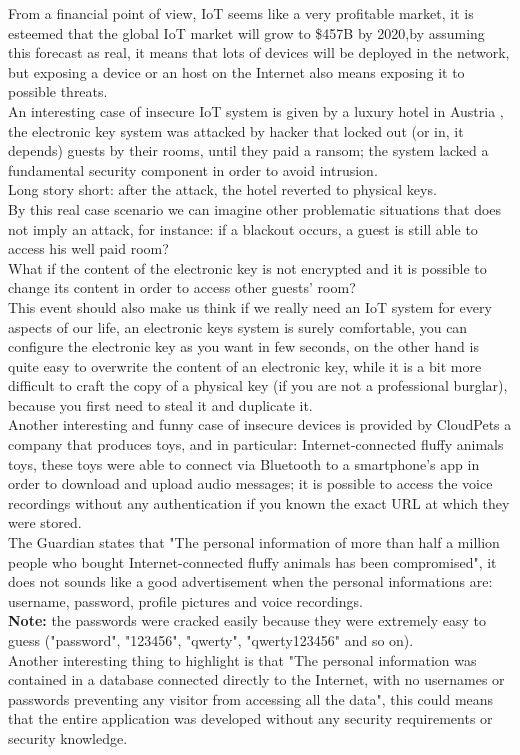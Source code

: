 	From a financial point of view, IoT seems like a very profitable market, it is esteemed that the global IoT market will grow to \$457B by 2020\cite{forbes},by assuming this forecast as real, it means that lots of devices will be deployed in the network, but exposing a device
	or an host on the Internet also means exposing it to possible threats.\\
	An interesting case of insecure IoT system is given by a luxury hotel in Austria \cite{whydoiot}, the electronic key system was attacked
	by hacker that locked out (or in, it depends) guests by their rooms, until they paid a ransom; the system lacked a fundamental security
	component in order to avoid intrusion.\\
	Long story short: after the attack, the hotel reverted to physical keys.\\
	By this real case scenario we can imagine other problematic situations that does not imply an attack, for instance: if a blackout occurs, a guest is still able to access	his well paid room?\\
	What if the content of the electronic key is not encrypted and it is possible to change its content in order to access other guests' room?\\
	This event should also make us think if we really need an IoT system for every aspects of our life, an electronic keys system is
	surely comfortable, you can configure the electronic key as you want in few seconds, on the other hand is quite easy to overwrite the content
	of an electronic key, while it is a bit more difficult to craft the copy of a physical key (if you are not a professional burglar), because you first need to steal it and duplicate it.\\
	Another interesting and funny case of insecure devices is provided by CloudPets\cite{toys} a company that produces toys, and in particular: Internet-connected fluffy animals toys,
	these toys were able to connect via Bluetooth to a smartphone's app in order to download and upload audio messages; it is possible to access the voice recordings without any authentication if you known the exact URL at which they were stored.\\
	The Guardian states that "The personal information of more than half a million people who bought Internet-connected fluffy animals has been compromised", it does not sounds like a good advertisement
	when the personal informations are: username, password, profile pictures and voice recordings.\\
	\textbf{Note:} the passwords were cracked easily because they were extremely easy to guess ("password", "123456", "qwerty", "qwerty123456" and so on).\\
	Another interesting thing to highlight is that "The personal information was contained in a database connected directly to the Internet, with no usernames or passwords preventing any visitor from accessing all the data", this could means that the entire application was developed without any security requirements or security knowledge.\\
	 
